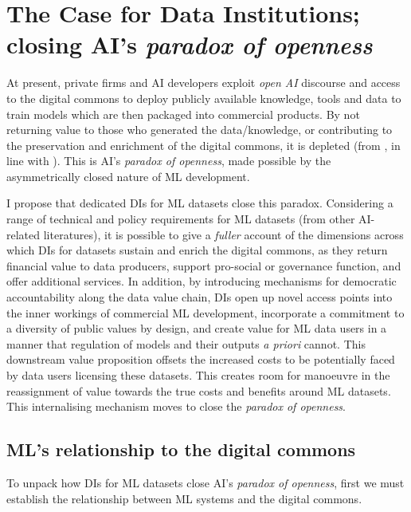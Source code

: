 \chapter{The Case for Data Institutions; closing AI's \textit{paradox of openness}}

At present, private firms and AI developers exploit \textit{open AI} discourse and access to the digital commons to deploy publicly available knowledge, tools and data to train models which are then packaged into commercial products. By not returning value to those who generated the data/knowledge, or contributing to the preservation and enrichment of the digital commons, it is depleted (from \textcite{PoliciesDigitalCommons}, in line with \textcite{ostromGoverningCommonsEvolution}). This is AI's \textit{paradox of openness}, made possible by the asymmetrically closed nature of ML development. 

I propose that dedicated DIs for ML datasets close this paradox. Considering a range of technical and policy requirements for ML datasets (from other AI-related literatures), it is possible to give a \textit{fuller} account of the dimensions across which DIs for datasets sustain and enrich the digital commons, as they return financial value to data producers, support pro-social or governance function, and offer additional services. In addition, by introducing mechanisms for democratic accountability along the data value chain, DIs open up novel access points into the inner workings of commercial ML development, incorporate a commitment to a diversity of public values by design, and create value for ML data users in a manner that regulation of models and their outputs \textit{a priori} cannot. This downstream value proposition offsets the increased costs to be potentially faced by data users licensing these datasets. This creates room for manoeuvre in the reassignment of value towards the true costs and benefits around ML datasets. This internalising mechanism moves to close the \textit{paradox of openness}.

\section*{ML's relationship to the digital commons}

To unpack how DIs for ML datasets close AI's \textit{paradox of openness}, first we must establish the relationship between ML systems and the digital commons.

